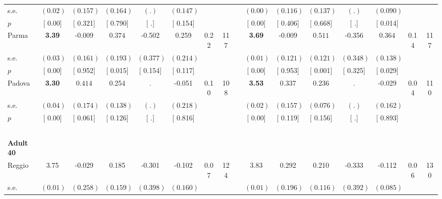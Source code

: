 \begin{longtable}{L{8em} c c c c c c c p{1em} c c c c c c c}
\quad \quad \quad \quad s.e.& $ (     0.02)$ & $ (    0.157)$ & $ (    0.164)$ & $ (        .)$ & $ (    0.147)$ & & & & $ (     0.00)$ & $ (    0.116)$ & $ (    0.137)$ & $ (        .)$ & $ (    0.090)$ & &  \\*
\quad \quad \quad \quad $ p$ & [     0.00] & [    0.321] & [    0.790] & [        .] & [    0.154] & & & & [     0.00] & [    0.406] & [    0.668] & [        .] & [    0.014] & &  \\[1em]
\quad \quad \quad Parma& \textbf{     3.39} &    -0.009 & $ \mathbf{    0.374}$ &    -0.502 &     0.259 &      0.22 &       117 & & \textbf{     3.69} &    -0.009 & $ \mathbf{    0.511}$ &    -0.356 & $ \mathbf{    0.364}$ &      0.14 &       117  \\*
\quad \quad \quad \quad s.e.& $ (     0.03)$ & $ (    0.161)$ & $ (    0.193)$ & $ (    0.377)$ & $ (    0.214)$ & & & & $ (     0.01)$ & $ (    0.121)$ & $ (    0.121)$ & $ (    0.348)$ & $ (    0.138)$ & &  \\*
\quad \quad \quad \quad $ p$ & [     0.00] & [    0.952] & [    0.015] & [    0.154] & [    0.117] & & & & [     0.00] & [    0.953] & [    0.001] & [    0.325] & [    0.029] & &  \\[1em]
\quad \quad \quad Padova& \textbf{     3.30} & $ \mathbf{    0.414}$ &     0.254 &         . &    -0.051 &      0.10 &       108 & & \textbf{     3.53} &     0.337 &     0.236 &         . &    -0.029 &      0.04 &       110  \\*
\quad \quad \quad \quad s.e.& $ (     0.04)$ & $ (    0.174)$ & $ (    0.138)$ & $ (        .)$ & $ (    0.218)$ & & & & $ (     0.02)$ & $ (    0.157)$ & $ (    0.076)$ & $ (        .)$ & $ (    0.162)$ & &  \\*
\quad \quad \quad \quad $ p$ & [     0.00] & [    0.061] & [    0.126] & [        .] & [    0.816] & & & & [     0.00] & [    0.119] & [    0.156] & [        .] & [    0.893] & &  \\[1em]
~\\[1em]
\quad \quad \textbf{Adult 40} & & & & & & & & & & & & & & & \\* 
\quad \quad \quad Reggio& 3.75 &    -0.029 &     0.185 &    -0.301 &    -0.102 &      0.07 &       124 & & 3.83 &     0.292 &     0.210 &    -0.333 &    -0.112 &      0.06 &       130  \\*
\quad \quad \quad \quad s.e.& $ (     0.01)$ & $ (    0.258)$ & $ (    0.159)$ & $ (    0.398)$ & $ (    0.160)$ & & & & $ (     0.01)$ & $ (    0.196)$ & $ (    0.116)$ & $ (    0.392)$ & $ (    0.085)$ & &  \\*

\end{longtable}
